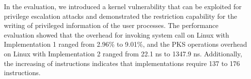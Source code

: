 %
%

%
%
%
In the evaluation, we introduced a kernel vulnerability that can be exploited for
privilege escalation attacks and demonstrated the restriction capability for the
writing of privileged information of the user processes.
%
The performance evaluation showed that the overhead for invoking system call 
on Linux with Implementation 1 ranged from 2.96\% to 9.01\%, and the PKS
operations overhead on Linux with Implementation 2 ranged from 22.1 ns to 1347.9
ns.
%
Additionally, the increasing of instructions indicates that implementations
require 137 to 176 instructions.

